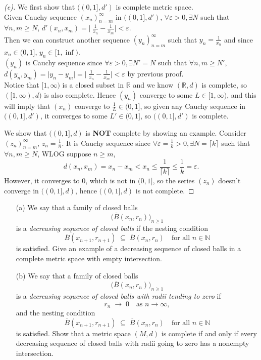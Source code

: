 \begin{proof}[(e)]
    We first show that $((0,1],d')$ is complete metric space. \\
    Given Cauchy sequence $(x_n)_{n=m}^\infty$ in $((0,1],d')$, $\forall \varepsilon > 0, \exists N$ such that $\forall n,m \geq N$, $d'(x_n,x_m) = \lvert \ \frac{1}{x_n} - \frac{1}{x_m} \rvert < \varepsilon$. \\
    Then we can construct another sequence $(y_n)_{n=m}^\infty$ such that $y_n = \frac{1}{x_n}$ and since $x_n \in (0, 1]$, $y_n \in [1,\inf)$. \\
    $(y_n)$ is Cauchy sequence since $\forall \varepsilon > 0, \exists N' = N$ such that $\forall n,m \geq N'$, $d(y_n, y_m) = \lvert y_n - y_m\rvert = \lvert \ \frac{1}{x_n} - \frac{1}{x_m} \rvert < \varepsilon$ by previous proof. \\
    Notice that $[1, \infty)$ is a closed subset in $\mathbb{R}$ and we know $(\mathbb{R}, d)$ is complete, so $([1, \infty ),d)$ is also complete. Hence $(y_n)$ converge to some $L \in [1,\infty)$, and this will imply that $(x_n)$ converge to $\frac{1}{L} \in (0,1]$, so given any Cauchy sequence in $((0,1],d')$, it converges to some $L' \in (0,1]$, so $((0,1],d')$ is complete.

    We show that $((0,1],d)$ is \textbf{NOT} complete by showing an example.
    Consider $(z_n)_{n=m}^\infty$, $z_n = \frac{1}{n}$. It is Cauchy sequence since $\forall \varepsilon = \frac{1}{k}> 0, \exists N = \lceil k \rceil$ such that $\forall n, m \geq N$, WLOG suppose $n \geq m$,
    \[
      d(x_n, x_m) = x_n - x_m < x_n \leq \frac{1}{\lceil k \rceil} \leq  \frac{1}{k} = \varepsilon.
    \]
    However, it converges to $0$, which is not in $(0,1]$, so the series $(z_n)$ doesn't converge in $((0,1],d)$, hence $((0,1],d)$ is not complete.
    
\end{proof}

\begin{problem}
    \begin{enumerate}

  \item[(a)] 
  We say that a family of closed balls 
\[
\bigl(\overline{B}(x_n,r_n)\bigr)_{n\ge 1}
\]
is a \emph{decreasing sequence of closed balls} if 
the nesting condition
\[
\overline{B}(x_{n+1},r_{n+1}) \;\subseteq\; \overline{B}(x_n,r_n)
\quad\text{for all } n\in\mathbb{N}
\]
is satisfied. Give an example of a decreasing sequence of closed balls in a complete metric space with empty intersection. 

  \item[(b)]  We say that a family of closed balls 
\[
\bigl(\overline{B}(x_n,r_n)\bigr)_{n\ge 1}
\]
is a \emph{decreasing sequence of closed balls with radii tending to zero} if 
\[
r_n \;\to\; 0 \quad\text{as } n\to\infty,
\]
and the nesting condition
\[
\overline{B}(x_{n+1},r_{n+1}) \;\subseteq\; \overline{B}(x_n,r_n)
\quad\text{for all } n\in\mathbb{N}
\]
is satisfied.
  Show that a metric space $(M,d)$ is complete if and only if every decreasing sequence of closed balls with radii going to zero has a nonempty intersection. \end{enumerate}
\end{problem}

